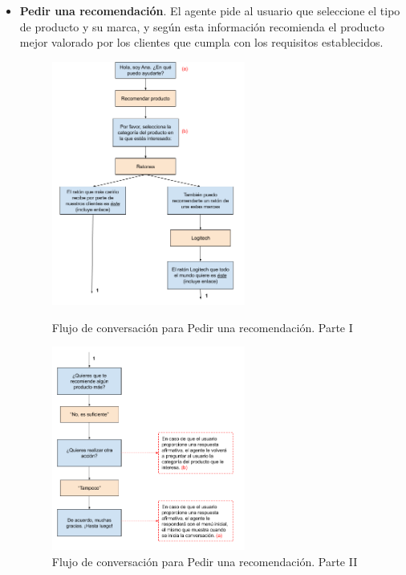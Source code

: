 \begin{itemize}
    \newpage

    \item \textbf{Pedir una recomendación}. El agente pide al usuario que seleccione el tipo de producto y su marca, y según esta información recomienda el producto mejor valorado por los clientes que cumpla con los requisitos establecidos. 
    
    \begin{figure}
    	\begin{center}
    		\includegraphics[width = 0.60\textwidth]{Figuras/Recomendar producto (1).png}
    		\caption{\label{fig:recomendarProducto1} Flujo de conversación para Pedir una recomendación. Parte I}
    		\includegraphics[width = 0.60\textwidth]{Figuras/Recomendar producto (2).png}
    		\caption{\label{fig:recomendarProducto2} Flujo de conversación para Pedir una recomendación. Parte II}

\end{center}
\end{figure}
\end{itemize}

